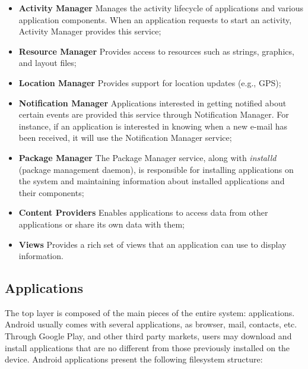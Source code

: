 \begin{itemize}
\item \textbf{Activity Manager} Manages the activity lifecycle of applications and various application components. When an application requests to start an activity, Activity Manager provides this service;

\item \textbf{Resource Manager} Provides access to resources such as strings, graphics, and layout files;

\item \textbf{Location Manager} Provides support for location updates (e.g., GPS);

\item \textbf{Notification Manager} Applications interested in getting notified about certain events are provided this service through Notification Manager. For instance, if an application is interested in knowing when a new e-mail has been received, it will use the Notification Manager service;

\item \textbf{Package Manager} The Package Manager service, along with \textit{installd} (package management daemon), is responsible for installing applications on the system and maintaining information about installed applications and their components;

\item \textbf{Content Providers} Enables applications to access data from other applications or share its own data with them;

\item \textbf{Views} Provides a rich set of views that an application can use to display information.

\end{itemize}



\subsection{Applications}

The top layer is composed of the main pieces of the entire system: applications. Android usually comes with several applications, as browser, mail, contacts, etc. Through Google Play, and other third party markets, users may download and install applications that are no different from those previously installed on the device. Android applications present the following filesystem structure:

